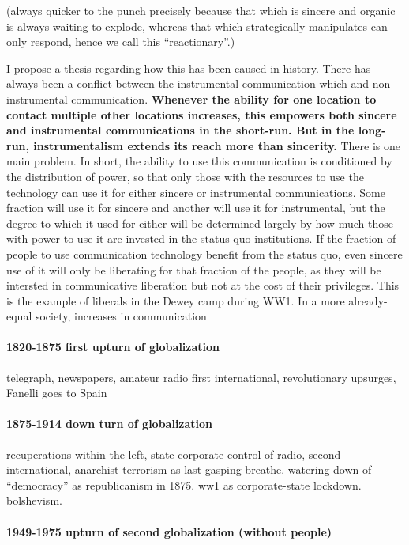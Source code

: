 \documentclass[12pt,book]{article}
\begin{document}
(always quicker to the punch precisely because that which is sincere and
organic is always waiting to explode, whereas that which strategically
manipulates can only respond, hence we call this ``reactionary''.)

I propose a thesis regarding how this has been caused in history. There
has always been a conflict between the instrumental communication which
and non-instrumental communication. \textbf{Whenever the ability for one
location to contact multiple other locations increases, this empowers
both sincere and instrumental communications in the short-run. But in
the long-run, instrumentalism extends its reach more than sincerity.}
There is one main problem. In short, the ability to use this
communication is conditioned by the distribution of power, so that only
those with the resources to use the technology can use it for either
sincere or instrumental communications. Some fraction will use it for
sincere and another will use it for instrumental, but the degree to
which it used for either will be determined largely by how much those
with power to use it are invested in the status quo institutions. If the
fraction of people to use communication technology benefit from the
status quo, even sincere use of it will only be liberating for that
fraction of the people, as they will be intersted in communicative
liberation but not at the cost of their privileges. This is the example
of liberals in the Dewey camp during WW1. In a more already-equal
society, increases in communication

\paragraph{1820-1875 first upturn of
globalization}\label{first-upturn-of-globalization}

telegraph, newspapers, amateur radio first international, revolutionary
upsurges, Fanelli goes to Spain

\paragraph{1875-1914 down turn of
globalization}\label{down-turn-of-globalization}

recuperations within the left, state-corporate control of radio, second
international, anarchist terrorism as last gasping breathe. watering
down of ``democracy'' as republicanism in 1875. ww1 as corporate-state
lockdown. bolshevism.

\paragraph{1949-1975 upturn of second globalization (without
people)}\label{upturn-of-second-globalization-without-people}
\end{document}
